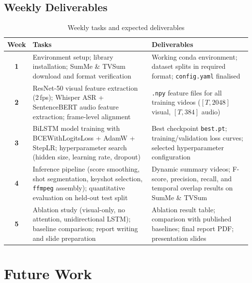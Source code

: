 \documentclass[12pt, a4paper]{report}
\begin{document}
\section{Weekly Deliverables}

\begin{table}[H]
\centering
\caption{Weekly tasks and expected deliverables}
\label{tab:timeline}
\begin{tabular}{>{\bfseries}c p{4.2cm} p{5.8cm}}
  \toprule
  \textbf{Week} & \textbf{Tasks} & \textbf{Deliverables} \\
  \midrule
  1
    & Environment setup; library installation; SumMe \& TVSum download and
      format verification
    & Working conda environment; dataset splits in required format;
      \texttt{config.yaml} finalised \\[6pt]
  2
    & ResNet-50 visual feature extraction (2\,fps); Whisper ASR + SentenceBERT
      audio feature extraction; frame-level alignment
    & \texttt{.npy} feature files for all training videos
      ($[T,2048]$ visual, $[T,384]$ audio) \\[6pt]
  3
    & BiLSTM model training with BCEWithLogitsLoss + AdamW + StepLR;
      hyperparameter search (hidden size, learning rate, dropout)
    & Best checkpoint \texttt{best.pt}; training/validation loss curves;
      selected hyperparameter configuration \\[6pt]
  4
    & Inference pipeline (score smoothing, shot segmentation, keyshot
      selection, \texttt{ffmpeg} assembly); quantitative evaluation on
      held-out test split
    & Dynamic summary videos; F-score, precision, recall, and temporal
      overlap results on SumMe \& TVSum \\[6pt]
  5
    & Ablation study (visual-only, no attention, unidirectional LSTM);
      baseline comparison; report writing and slide preparation
    & Ablation result table; comparison with published baselines;
      final report PDF; presentation slides \\
  \bottomrule
\end{tabular}
\end{table}

\chapter{Future Work}
\end{document}
